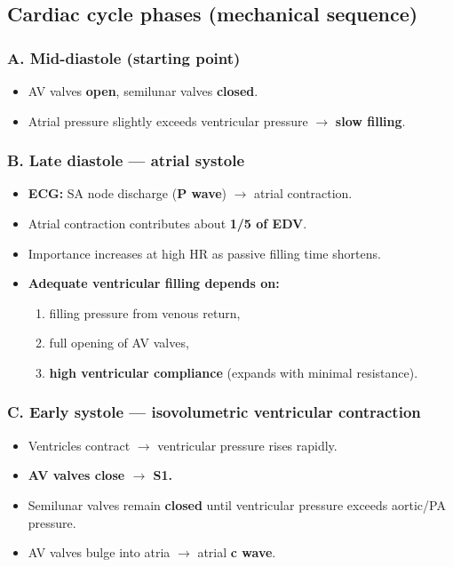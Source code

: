 \documentclass[11pt,a4paper]{article}
\begin{document}
\subsection{Cardiac cycle phases (mechanical sequence)}

\subsubsection{A. Mid-diastole (starting point)}
\begin{itemize}
\item AV valves \textbf{open}, semilunar valves \textbf{closed}.
\item Atrial pressure slightly exceeds ventricular pressure $\rightarrow$ \textbf{slow filling}.
\end{itemize}

\subsubsection{B. Late diastole --- atrial systole}
\begin{itemize}
\item \textbf{ECG:} SA node discharge (\textbf{P wave}) $\rightarrow$ atrial contraction.
\item Atrial contraction contributes about \textbf{1/5 of EDV}.
\item Importance increases at high HR as passive filling time shortens.
\item \textbf{Adequate ventricular filling depends on:}
  \begin{enumerate}
  \item filling pressure from venous return,
  \item full opening of AV valves,
  \item \textbf{high ventricular compliance} (expands with minimal resistance).
  \end{enumerate}
\end{itemize}

\subsubsection{C. Early systole --- isovolumetric ventricular contraction}
\begin{itemize}
\item Ventricles contract $\rightarrow$ ventricular pressure rises rapidly.
\item \textbf{AV valves close $\rightarrow$ S1.}
\item Semilunar valves remain \textbf{closed} until ventricular pressure exceeds aortic/PA pressure.
\item AV valves bulge into atria $\rightarrow$ atrial \textbf{c wave}.
\end{itemize}
\end{document}
